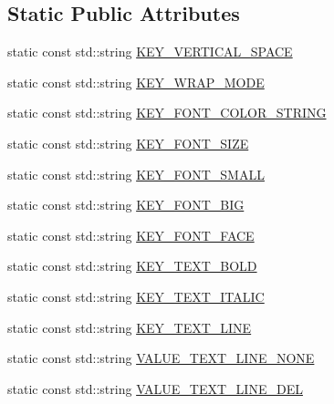 \subsection*{Static Public Attributes}
\begin{DoxyCompactItemize}
\item 
static const std\+::string \hyperlink{classui_1_1RichText_aafaa649d0090a6395e33db8260b7c947}{K\+E\+Y\+\_\+\+V\+E\+R\+T\+I\+C\+A\+L\+\_\+\+S\+P\+A\+CE}
\item 
static const std\+::string \hyperlink{classui_1_1RichText_a187a1da319ad4e0a7735c019e72e4ca8}{K\+E\+Y\+\_\+\+W\+R\+A\+P\+\_\+\+M\+O\+DE}
\item 
static const std\+::string \hyperlink{classui_1_1RichText_a2ce7959b432f8aa9f840b743323f3e8f}{K\+E\+Y\+\_\+\+F\+O\+N\+T\+\_\+\+C\+O\+L\+O\+R\+\_\+\+S\+T\+R\+I\+NG}
\item 
static const std\+::string \hyperlink{classui_1_1RichText_a11fdac9c5788c91aad497b147e8016ff}{K\+E\+Y\+\_\+\+F\+O\+N\+T\+\_\+\+S\+I\+ZE}
\item 
static const std\+::string \hyperlink{classui_1_1RichText_a411f11d3cab0eea1eff4cbb209119984}{K\+E\+Y\+\_\+\+F\+O\+N\+T\+\_\+\+S\+M\+A\+LL}
\item 
static const std\+::string \hyperlink{classui_1_1RichText_a653e354559b29baa3ef36f1626ec6981}{K\+E\+Y\+\_\+\+F\+O\+N\+T\+\_\+\+B\+IG}
\item 
static const std\+::string \hyperlink{classui_1_1RichText_a26963265cb953c676222e9b302ed20c4}{K\+E\+Y\+\_\+\+F\+O\+N\+T\+\_\+\+F\+A\+CE}
\item 
static const std\+::string \hyperlink{classui_1_1RichText_a7d3535f7df3a1c2f0794ca08ed616d1c}{K\+E\+Y\+\_\+\+T\+E\+X\+T\+\_\+\+B\+O\+LD}
\item 
static const std\+::string \hyperlink{classui_1_1RichText_a2e2afdb6d58039fe1df90cab41a8a6c5}{K\+E\+Y\+\_\+\+T\+E\+X\+T\+\_\+\+I\+T\+A\+L\+IC}
\item 
static const std\+::string \hyperlink{classui_1_1RichText_add95eb2e23a5a7dbf9dba353226cc745}{K\+E\+Y\+\_\+\+T\+E\+X\+T\+\_\+\+L\+I\+NE}
\item 
static const std\+::string \hyperlink{classui_1_1RichText_a163bdbf308eeba8a44cd5e911152837c}{V\+A\+L\+U\+E\+\_\+\+T\+E\+X\+T\+\_\+\+L\+I\+N\+E\+\_\+\+N\+O\+NE}
\item 
static const std\+::string \hyperlink{classui_1_1RichText_a9714aa0d351221f74048696cf9723b0c}{V\+A\+L\+U\+E\+\_\+\+T\+E\+X\+T\+\_\+\+L\+I\+N\+E\+\_\+\+D\+EL}
\item 

\end{DoxyCompactItemize}
